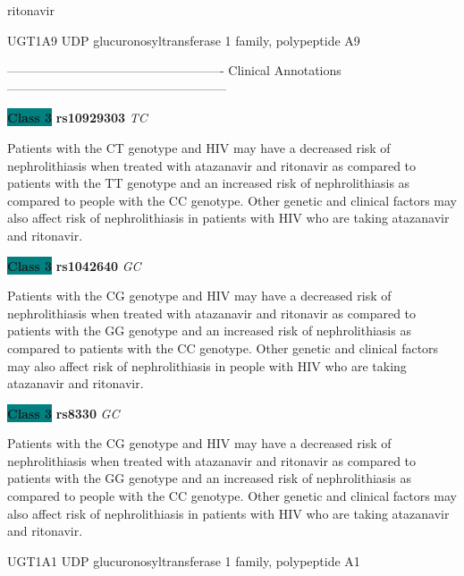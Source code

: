 \documentclass{resume} %
\begin{document}
\begin{rSection}{ ritonavir }
\begin{rSubsection}{ UGT1A9 }{ UDP glucuronosyltransferase 1 family, polypeptide A9 }{}{}
\item[] ---------------------------------------------------- Clinical Annotations -----------------------------------------------------\newline
\item \textbf{\colorbox{teal} {Class 3}} \textbf{ rs10929303 } \textit{ TC }
\item[] Patients with the CT genotype and HIV may have a decreased risk of nephrolithiasis when treated with atazanavir and ritonavir as compared to patients with the TT genotype and an increased risk of nephrolithiasis as compared to people with the CC genotype. Other genetic and clinical factors may also affect risk of nephrolithiasis in patients with HIV who are taking atazanavir and ritonavir. \item \textbf{\colorbox{teal} {Class 3}} \textbf{ rs1042640 } \textit{ GC }
\item[] Patients with the CG genotype and HIV may have a decreased risk of nephrolithiasis when treated with atazanavir and ritonavir as compared to patients with the GG genotype and an increased risk of nephrolithiasis as compared to patients with the CC genotype. Other genetic and clinical factors may also affect risk of nephrolithiasis in people with HIV who are taking atazanavir and ritonavir.\item \textbf{\colorbox{teal} {Class 3}} \textbf{ rs8330 } \textit{ GC }
\item[] Patients with the CG genotype and HIV may have a decreased risk of nephrolithiasis when treated with atazanavir and ritonavir as compared to patients with the GG genotype and an increased risk of nephrolithiasis as compared to people with the CC genotype. Other genetic and clinical factors may also affect risk of nephrolithiasis in patients with HIV who are taking atazanavir and ritonavir.
\end{rSubsection}\begin{rSubsection}{ UGT1A1 }{ UDP glucuronosyltransferase 1 family, polypeptide A1 }{}{}
\item[]


\end{rSubsection}
\end{rSection}
\end{document}
